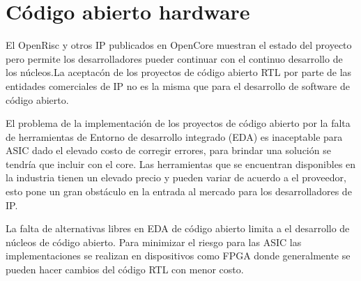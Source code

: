 \section {Código abierto hardware}

El OpenRisc y otros IP  publicados en OpenCore muestran el estado del proyecto pero permite los desarrolladores pueder continuar con el continuo desarrollo de los núcleos.La aceptacón de los proyectos de código abierto RTL por parte de las entidades comerciales de IP no es la misma que para el desarrollo de software de código abierto.

El problema de la implementación de los proyectos de código abierto por la falta de herramientas de Entorno de desarrollo integrado (EDA)  es inaceptable para ASIC dado el elevado costo de corregir errores, para brindar una solución se tendría que incluir con el core. Las herramientas  que se encuentran disponibles en la industria tienen un elevado precio y pueden variar de acuerdo a el proveedor, esto pone un gran obstáculo en la entrada al mercado para los desarrolladores de IP.

La falta de alternativas libres en EDA de código abierto limita a el desarrollo de núcleos de código abierto. Para minimizar el riesgo para las ASIC las implementaciones se realizan en dispositivos como FPGA donde generalmente se pueden hacer cambios del código RTL con menor costo. 
 



